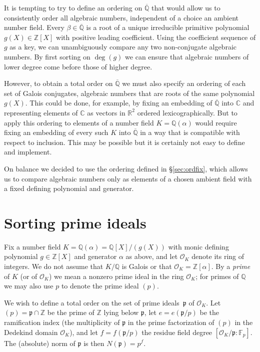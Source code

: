 \documentclass{article}
\def\Sage{{\tt Sage}}
\def\Z{{\mathbb Z}}
\def\Q{{\mathbb Q}}
\def\R{{\mathbb R}}
\def\C{{\mathbb C}}
\def\F{{\mathbb F}}
\def\OO{{\mathcal O}}
\def\p{{\mathfrak p}}
\def\Qbar{\overline{\Q}}
\begin{document}
It is tempting to try to define an ordering on $\Qbar$ that would
allow us to consistently order all algebraic numbers, independent
of a choice an ambient number field.  Every $\beta\in\Qbar$ is a root of a
unique irreducible primitive polynomial $g(X)\in\Z[X]$  with positive
leading coefficient.  Using the coefficient sequence
of $g$ as a key, we can unambiguously  compare any two non-conjugate algebraic
numbers. By first sorting on $\deg(g)$ we can ensure that algebraic numbers of
lower degree come before those of higher degree.

However, to obtain a total order on $\Qbar$ we must also specify
an ordering of each set of Galois conjugates, algebraic numbers
that are roots of the same polynomial $g(X)$.  This could be done, for example, by fixing an
embedding of $\Qbar$ into $\C$ and representing elements of $\C$ as
vectors in $\R^2$ ordered lexicographically. But to apply this ordering to
elements of a number field $K=\Q(\alpha)$ would require fixing an
embedding of every such $K$ into $\Qbar$ in a way that is compatible
with respect to inclusion.  This may be possible but it
is certainly not easy to define and implement.

On balance we decided to use the ordering defined in \S\ref{sec:ordfix}, which allows us to compare algebraic numbers only as elements of a chosen ambient field with a fixed defining polynomial and generator.

\section{Sorting prime ideals}\label{sec:primes}
Fix a number field $K=\Q(\alpha)=\Q[X]/(g(X))$ with monic defining
polynomial $g\in\Z[X]$ and generator $\alpha$ as above, and let
$\OO_K$ denote its ring of integers.  We do not assume that $K/\Q$ is
Galois or that $\OO_K=\Z[\alpha]$.  By a \emph{prime} of $K$ (or of
$\OO_K$) we mean a nonzero prime ideal in the ring $\OO_K$; for primes
of $\Q$ we may also use $p$ to denote the prime ideal $(p)$.

We wish to define a total order on the set of prime ideals~$\p$
of $\OO_K$.  Let $(p)=\p\cap \Z$ be the prime of $\Z$ lying below $\p$,
let $e=e(\p/p)$ be the ramification index (the multiplicity of $\p$ in the prime factorization of $(p)$ in the Dedekind domain $\OO_K$), and let $f=f(\p/p)$ the residue field degree $[\OO_K/\p:\F_p]$.
The (absolute) norm of $\p$ is then $N(\p)=p^f$.

\end{document}
